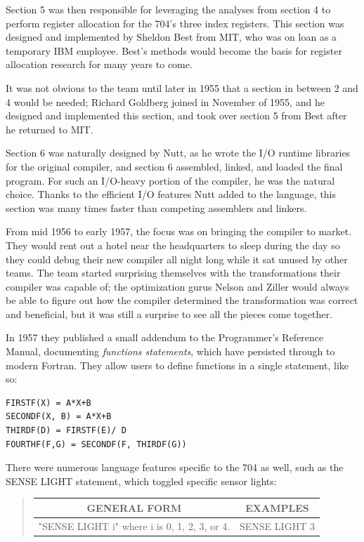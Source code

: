 Section 5 was then responsible for leveraging the analyses from section 4
to perform register allocation for the 704's three index registers.
This section was designed and implemented by Sheldon Best from MIT,
who was on loan as a temporary IBM employee.
Best's methods would become the basis for register allocation research for many years to come.

It was not obvious to the team until later in 1955 that a section in
between 2 and 4 would be needed; Richard Goldberg joined in November of 1955,
and he designed and implemented this section,
and took over section 5 from Best after he returned to MIT.

Section 6 was naturally designed by Nutt, as he wrote the I/O runtime libraries
for the original compiler, and section 6 assembled, linked, and loaded the final program.
For such an I/O-heavy portion of the compiler, he was the natural choice.
Thanks to the efficient I/O features Nutt added to the language, this section
was many times faster than competing assemblers and linkers.

From mid 1956 to early 1957, the focus was on bringing the compiler to market.
They would rent out a hotel near the headquarters to sleep during the day
so they could debug their new compiler all night long while it sat unused by other
teams.
The team started surprising themselves with the transformations their compiler
was capable of; the optimization gurus Nelson and Ziller would always be able to figure
out how the compiler determined the transformation was correct and beneficial, but
it was still a surprise to see all the pieces come together.

In 1957 they published a small addendum to the Programmer's Reference Manual,
documenting \textit{functions statements}, which have persisted through to modern Fortran.
They allow users to define functions in a single statement, like so:

\begin{lstlisting}
FIRSTF(X) = A*X+B
SECONDF(X, B) = A*X+B
THIRDF(D) = FIRSTF(E)/ D
FOURTHF(F,G) = SECONDF(F, THIRDF(G))
\end{lstlisting}

There were numerous language features specific to the 704 as well,
such as the SENSE LIGHT statement, which toggled specific sensor lights:

\begin{quotation}
	\begin{tabular}{|c|c|}
		\hline
		GENERAL FORM                                 & EXAMPLES      \\
		\hline
		"SENSE LIGHT i" where i is 0, 1, 2, 3, or 4. & SENSE LIGHT 3 \\
		\hline
	\end{tabular}
\end{quotation}

